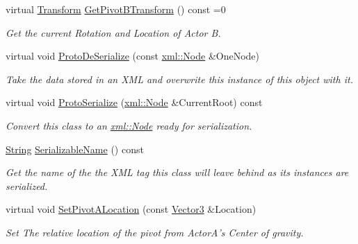 \begin{DoxyCompactItemize}
virtual \hyperlink{classphys_1_1Transform}{Transform} \hyperlink{classphys_1_1DualTransformConstraint_a7ef9820bbfa2f0d70019743e16cb2618}{GetPivotBTransform} () const =0
\begin{DoxyCompactList}\small\item\em Get the current Rotation and Location of Actor B. \item\end{DoxyCompactList}\item 
virtual void \hyperlink{classphys_1_1DualTransformConstraint_a72bb3a5f35dffc4b6b9b860eb232b7a3}{ProtoDeSerialize} (const \hyperlink{classphys_1_1xml_1_1Node}{xml::Node} \&OneNode)
\begin{DoxyCompactList}\small\item\em Take the data stored in an XML and overwrite this instance of this object with it. \item\end{DoxyCompactList}\item 
virtual void \hyperlink{classphys_1_1DualTransformConstraint_aa1e3919874eceedb6ba708af4d540b9b}{ProtoSerialize} (\hyperlink{classphys_1_1xml_1_1Node}{xml::Node} \&CurrentRoot) const 
\begin{DoxyCompactList}\small\item\em Convert this class to an \hyperlink{classphys_1_1xml_1_1Node}{xml::Node} ready for serialization. \item\end{DoxyCompactList}\item 
\hyperlink{namespacephys_aa03900411993de7fbfec4789bc1d392e}{String} \hyperlink{classphys_1_1DualTransformConstraint_ad810321a7395cbd5cc0ba8cac0d3b136}{SerializableName} () const 
\begin{DoxyCompactList}\small\item\em Get the name of the the XML tag this class will leave behind as its instances are serialized. \item\end{DoxyCompactList}\item 
virtual void \hyperlink{classphys_1_1DualTransformConstraint_a0e074a05eeb464ebda332ac2f09c9412}{SetPivotALocation} (const \hyperlink{classphys_1_1Vector3}{Vector3} \&Location)
\begin{DoxyCompactList}\small\item\em Set The relative location of the pivot from ActorA's Center of gravity. \item\end{DoxyCompactList}\item 

\end{DoxyCompactItemize}
